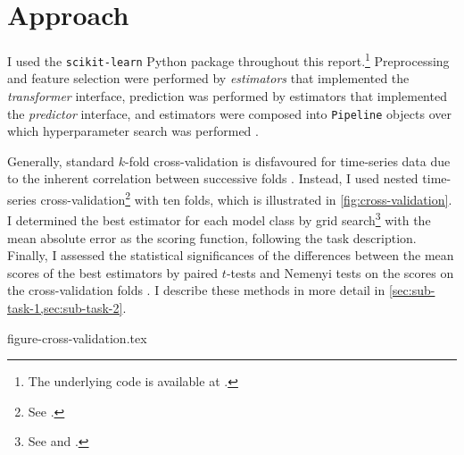 \section{Approach}
\label{sec:approach}

I used the \texttt{scikit-learn} Python package \parencite{Pedregosa2011} throughout
this report.\footnote{The underlying code is available at
  .
}
Preprocessing and feature selection were performed by \emph{estimators} that
implemented the \emph{transformer} interface, prediction was performed by estimators
that implemented the \emph{predictor} interface, and estimators were composed into
\texttt{Pipeline} objects over which hyperparameter search was performed
\parencite[4-9]{Buitinck2013}.

Generally, standard $k$-fold cross-validation is disfavoured for time-series data due
to the inherent correlation between successive folds \parencite{Bergmeir2018}.
Instead, I used nested time-series cross-validation\footnote{See
  .
} with ten folds, which is illustrated in
\cref{fig:cross-validation}.
I determined the best estimator for each model class by grid search\footnote{See
   and
  .
} with the mean absolute error as the scoring function, following the task description.
Finally, I assessed the statistical significances of the differences between the mean
scores of the best estimators by paired $t$-tests and Nemenyi tests on the scores on
the cross-validation folds \parencite[353-354]{Flach2012}.
I describe these methods in more detail in \cref{sec:sub-task-1,sec:sub-task-2}.

{figure-cross-validation.tex}
